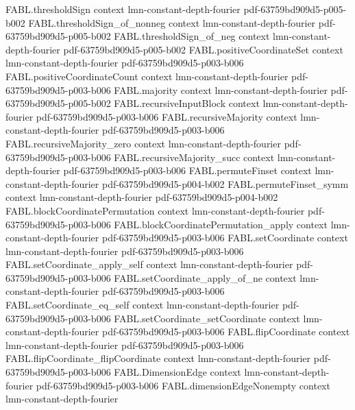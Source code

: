 \begin{theorem}[Parseval]
\proofstep
  {FABL.thresholdSign}
  {context}
  {lmn-constant-depth-fourier}
  {pdf-63759bd909d5-p005-b002}
\proofstep
  {FABL.thresholdSign_of_nonneg}
  {context}
  {lmn-constant-depth-fourier}
  {pdf-63759bd909d5-p005-b002}
\proofstep
  {FABL.thresholdSign_of_neg}
  {context}
  {lmn-constant-depth-fourier}
  {pdf-63759bd909d5-p005-b002}
\proofstep
  {FABL.positiveCoordinateSet}
  {context}
  {lmn-constant-depth-fourier}
  {pdf-63759bd909d5-p003-b006}
\proofstep
  {FABL.positiveCoordinateCount}
  {context}
  {lmn-constant-depth-fourier}
  {pdf-63759bd909d5-p003-b006}
\proofstep
  {FABL.majority}
  {context}
  {lmn-constant-depth-fourier}
  {pdf-63759bd909d5-p005-b002}
\proofstep
  {FABL.recursiveInputBlock}
  {context}
  {lmn-constant-depth-fourier}
  {pdf-63759bd909d5-p003-b006}
\proofstep
  {FABL.recursiveMajority}
  {context}
  {lmn-constant-depth-fourier}
  {pdf-63759bd909d5-p003-b006}
\proofstep
  {FABL.recursiveMajority_zero}
  {context}
  {lmn-constant-depth-fourier}
  {pdf-63759bd909d5-p003-b006}
\proofstep
  {FABL.recursiveMajority_succ}
  {context}
  {lmn-constant-depth-fourier}
  {pdf-63759bd909d5-p003-b006}
\proofstep
  {FABL.permuteFinset}
  {context}
  {lmn-constant-depth-fourier}
  {pdf-63759bd909d5-p004-b002}
\proofstep
  {FABL.permuteFinset_symm}
  {context}
  {lmn-constant-depth-fourier}
  {pdf-63759bd909d5-p004-b002}
\proofstep
  {FABL.blockCoordinatePermutation}
  {context}
  {lmn-constant-depth-fourier}
  {pdf-63759bd909d5-p003-b006}
\proofstep
  {FABL.blockCoordinatePermutation_apply}
  {context}
  {lmn-constant-depth-fourier}
  {pdf-63759bd909d5-p003-b006}
\proofstep
  {FABL.setCoordinate}
  {context}
  {lmn-constant-depth-fourier}
  {pdf-63759bd909d5-p003-b006}
\proofstep
  {FABL.setCoordinate_apply_self}
  {context}
  {lmn-constant-depth-fourier}
  {pdf-63759bd909d5-p003-b006}
\proofstep
  {FABL.setCoordinate_apply_of_ne}
  {context}
  {lmn-constant-depth-fourier}
  {pdf-63759bd909d5-p003-b006}
\proofstep
  {FABL.setCoordinate_eq_self}
  {context}
  {lmn-constant-depth-fourier}
  {pdf-63759bd909d5-p003-b006}
\proofstep
  {FABL.setCoordinate_setCoordinate}
  {context}
  {lmn-constant-depth-fourier}
  {pdf-63759bd909d5-p003-b006}
\proofstep
  {FABL.flipCoordinate}
  {context}
  {lmn-constant-depth-fourier}
  {pdf-63759bd909d5-p003-b006}
\proofstep
  {FABL.flipCoordinate_flipCoordinate}
  {context}
  {lmn-constant-depth-fourier}
  {pdf-63759bd909d5-p003-b006}
\proofstep
  {FABL.DimensionEdge}
  {context}
  {lmn-constant-depth-fourier}
  {pdf-63759bd909d5-p003-b006}
\proofstep
  {FABL.dimensionEdgeNonempty}
  {context}
  {lmn-constant-depth-fourier}

\end{theorem}
